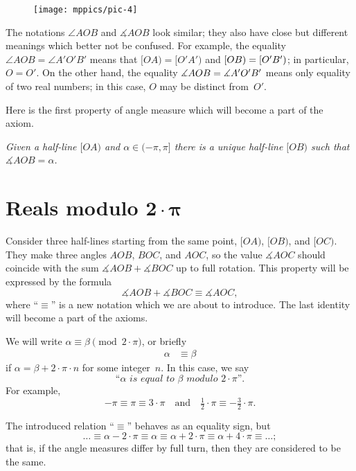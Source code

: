 \begin{wrapfigure}{o}{25mm}
\vskip-0mm
\centering
\texttt{[image: mppics/pic-4]}
\end{wrapfigure}

The notations $\angle AOB$ and $\measuredangle AOB$ look similar;
they also have close but different meanings which better not be confused.
For example, the equality 
$\angle AOB=\angle A'O'B'$
means that
$[OA)=[O'A')$ and $[OB)\z=[O'B')$;
in particular, $O=O'$.
On the other hand, the equality 
$\measuredangle AOB\z=\measuredangle A'O'B'$ 
means only equality of two real numbers;
in this case, $O$ may be distinct from~$O'$.

Here is the first property of angle measure which will become a part of the axiom.

\textit{Given a half-line $[O A)$ and $\alpha\in(-\pi,\pi]$ there is a unique half-line $[O B)$ such that $\measuredangle A O B= \alpha$.}





\section*{Reals modulo $\bm{2\cdot\pi}$}



Consider three half-lines starting from the same point, $[O A)$, $[O B)$, and $[O C)$.
They make three angles $A O B$, $B O C$, and $A O C$,
so the value $\measuredangle A O C$ should coincide with
the sum $\measuredangle A O B+\measuredangle B O C$ up to full rotation.
This property will be expressed by the formula 
$$\measuredangle A O B+\measuredangle B O C\equiv \measuredangle A O C,$$
where ``$\equiv$'' is a new notation which we are about to introduce.
The last identity will become a part of the axioms.

We will write $\alpha\equiv\beta\pmod{2\cdot\pi}$, or briefly
\begin{align*}
\alpha&\equiv\beta
\end{align*}
if $\alpha=\beta+2\cdot\pi\cdot n$
for some integer~$n$.
In this case, we say 
$$\textit{``$\alpha$ is equal to $\beta$ modulo $2\cdot\pi$''}.$$
For example, 
$$-\pi
\equiv
\pi\equiv 3\cdot\pi
\quad
\text{and}
\quad
\tfrac12\cdot\pi
\equiv
-\tfrac32\cdot\pi.$$

The introduced relation ``$\equiv$'' behaves as an equality sign,
but
\[\dots\equiv\alpha-2\cdot\pi\equiv \alpha\equiv \alpha+2\cdot\pi\equiv \alpha+4\cdot\pi\equiv\dots;\] 
that is, if the angle measures differ by full turn,
then they are considered to be the same.


